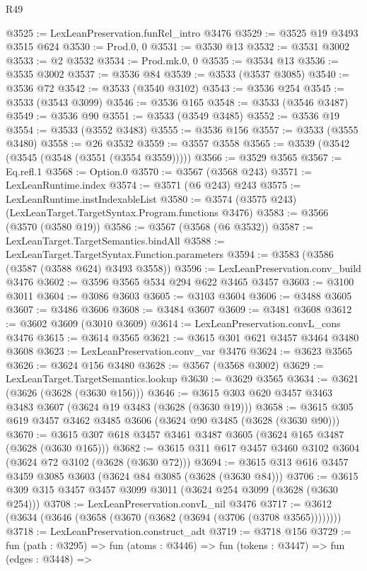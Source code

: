 \begin{lexlean}{R49}
\begin{coremodule}
@3525 := LexLeanPreservation.funRel_intro @3476
@3529 := @3525 @19 @3493 @3515 @624
@3530 := Prod.{0, 0}
@3531 := @3530 @13
@3532 := @3531 @3002
@3533 := @2 @3532
@3534 := Prod.mk.{0, 0}
@3535 := @3534 @13
@3536 := @3535 @3002
@3537 := @3536 @84
@3539 := @3533 (@3537 @3085)
@3540 := @3536 @72
@3542 := @3533 (@3540 @3102)
@3543 := @3536 @254
@3545 := @3533 (@3543 @3099)
@3546 := @3536 @165
@3548 := @3533 (@3546 @3487)
@3549 := @3536 @90
@3551 := @3533 (@3549 @3485)
@3552 := @3536 @19
@3554 := @3533 (@3552 @3483)
@3555 := @3536 @156
@3557 := @3533 (@3555 @3480)
@3558 := @26 @3532
@3559 := @3557 @3558
@3565 := @3539 (@3542 (@3545 (@3548 (@3551 (@3554 @3559)))))
@3566 := @3529 @3565
@3567 := Eq.refl.{1}
@3568 := Option.{0}
@3570 := @3567 (@3568 @243)
@3571 := LexLeanRuntime.index
@3574 := @3571 (@6 @243) @243
@3575 := LexLeanRuntime.instIndexableList
@3580 := @3574 (@3575 @243) (LexLeanTarget.TargetSyntax.Program.functions @3476)
@3583 := @3566 (@3570 (@3580 @19))
@3586 := @3567 (@3568 (@6 @3532))
@3587 := LexLeanTarget.TargetSemantics.bindAll
@3588 := LexLeanTarget.TargetSyntax.Function.parameters
@3594 := @3583 (@3586 (@3587 (@3588 @624) @3493 @3558))
@3596 := LexLeanPreservation.conv_build @3476
@3602 := @3596 @3565 @534 @294 @622 @3465 @3457
@3603 := @3100 @3011
@3604 := @3086 @3603
@3605 := @3103 @3604
@3606 := @3488 @3605
@3607 := @3486 @3606
@3608 := @3484 @3607
@3609 := @3481 @3608
@3612 := @3602 @3609 (@3010 @3609)
@3614 := LexLeanPreservation.convL_cons @3476
@3615 := @3614 @3565
@3621 := @3615 @301 @621 @3457 @3464 @3480 @3608
@3623 := LexLeanPreservation.conv_var @3476
@3624 := @3623 @3565
@3626 := @3624 @156 @3480
@3628 := @3567 (@3568 @3002)
@3629 := LexLeanTarget.TargetSemantics.lookup
@3630 := @3629 @3565
@3634 := @3621 (@3626 (@3628 (@3630 @156)))
@3646 := @3615 @303 @620 @3457 @3463 @3483 @3607 (@3624 @19 @3483 (@3628 (@3630 @19)))
@3658 := @3615 @305 @619 @3457 @3462 @3485 @3606 (@3624 @90 @3485 (@3628 (@3630 @90)))
@3670 := @3615 @307 @618 @3457 @3461 @3487 @3605 (@3624 @165 @3487 (@3628 (@3630 @165)))
@3682 := @3615 @311 @617 @3457 @3460 @3102 @3604 (@3624 @72 @3102 (@3628 (@3630 @72)))
@3694 := @3615 @313 @616 @3457 @3459 @3085 @3603 (@3624 @84 @3085 (@3628 (@3630 @84)))
@3706 := @3615 @309 @315 @3457 @3457 @3099 @3011 (@3624 @254 @3099 (@3628 (@3630 @254)))
@3708 := LexLeanPreservation.convL_nil @3476
@3717 := @3612 (@3634 (@3646 (@3658 (@3670 (@3682 (@3694 (@3706 (@3708 @3565))))))))
@3718 := LexLeanPreservation.construct_adt
@3719 := @3718 @156
@3729 := fun (path : @3295) =>
  fun (atoms : @3446) =>
  fun (tokens : @3447) =>
  fun (edges : @3448) =>

\end{coremodule}
\end{lexlean}
